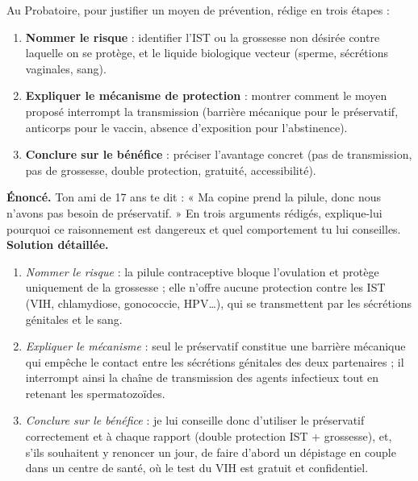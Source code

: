 \documentclass[11pt]{article}
\begin{document}
\begin{methode}
Au Probatoire, pour justifier un moyen de prévention, rédige en trois étapes :
\begin{enumerate}
\item \textbf{Nommer le risque} : identifier l'IST ou la grossesse non désirée contre laquelle on se protège, et le liquide biologique vecteur (sperme, sécrétions vaginales, sang).
\item \textbf{Expliquer le mécanisme de protection} : montrer comment le moyen proposé interrompt la transmission (barrière mécanique pour le préservatif, anticorps pour le vaccin, absence d'exposition pour l'abstinence).
\item \textbf{Conclure sur le bénéfice} : préciser l'avantage concret (pas de transmission, pas de grossesse, double protection, gratuité, accessibilité).
\end{enumerate}
\end{methode}

\begin{exoresolu}
\textbf{Énoncé.} Ton ami de 17 ans te dit : « Ma copine prend la pilule, donc nous n'avons pas besoin de préservatif. » En trois arguments rédigés, explique-lui pourquoi ce raisonnement est dangereux et quel comportement tu lui conseilles.
\tcblower
\textbf{Solution détaillée.}
\begin{enumerate}
\item \emph{Nommer le risque} : la pilule contraceptive bloque l'ovulation et protège uniquement de la grossesse ; elle n'offre aucune protection contre les IST (VIH, chlamydiose, gonococcie, HPV\ldots), qui se transmettent par les sécrétions génitales et le sang.
\item \emph{Expliquer le mécanisme} : seul le préservatif constitue une barrière mécanique qui empêche le contact entre les sécrétions génitales des deux partenaires ; il interrompt ainsi la chaîne de transmission des agents infectieux tout en retenant les spermatozoïdes.
\item \emph{Conclure sur le bénéfice} : je lui conseille donc d'utiliser le préservatif correctement et à chaque rapport (double protection IST + grossesse), et, s'ils souhaitent y renoncer un jour, de faire d'abord un dépistage en couple dans un centre de santé, où le test du VIH est gratuit et confidentiel.
\end{enumerate}
\end{exoresolu}
\end{document}
